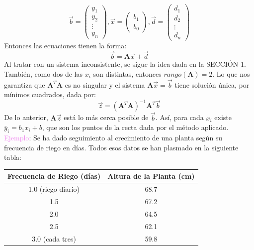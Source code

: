 \documentclass[11pt]{article}
\theoremstyle{definition}
\begin{document}
\begin{enumerate}[(i)]
\begin{equation*}
\vec{b} =
\begin{pmatrix}
y_{1}\\
y_{2}\\
\vdots\\
y_{n}
\end{pmatrix}, 
\vec{x} =
\begin{pmatrix}
b_{1}\\
b_{0}
\end{pmatrix}, 
\vec{d} =
\begin{pmatrix}
d_{1}\\
d_{2}\\
\vdots\\
d_{n}
\end{pmatrix}
\end{equation*}
Entonces las ecuaciones tienen la forma:
\begin{equation*}
\vec{b} = \textbf{A}\vec{x} + \vec{d}
\end{equation*}
Al tratar con un sistema inconsistente, se sigue la idea dada en la SECCI\'ON 1. Tambi\'en, como dos de las $x_{i}$ son distintas, entonces $rango(\textbf{A}) = 2$. Lo que nos garantiza que $\textbf{A}^{T}\textbf{A}$ es no singular y el sistema $\textbf{A}\vec{x} = \vec{b}$ tiene soluci\'on \'unica, por m\'inimos cuadrados, dada por:
\begin{equation}
\vec{z} = \left(\textbf{A}^{T}\textbf{A}\right)^{-1}\textbf{A}^{T}\vec{b}
\end{equation}
De lo anterior, $\textbf{A}\vec{z}$ est\'a lo m\'as cerca posible de $\vec{b}$. As\'i, para cada $x_{i}$ existe $\bar{y}_{i} = b_{1}x_{i} + b$, que son los puntos de la recta dada por el m\'etodo aplicado.\\
\vspace{2mm} %
\textcolor{violet}{Ejemplo}: Se ha dado seguimiento al crecimiento de una planta seg\'un su frecuencia de riego en d\'ias. Todos esos datos se han plasmado en la siguiente tabla:
\begin{table}[ht]
\centering
\begin{tabular}{|c|c|}
\hline
\textbf{Frecuencia de Riego} (d\'ias) & \textbf{Altura de la Planta} (cm) \\ \hline
1.0 (riego diario)  & 68.7\\ \hline
1.5                & 67.2\\ \hline
2.0                & 64.5\\ \hline
2.5                 & 62.1\\ \hline
3.0 (cada tres)  & 59.8\\ \hline

\end{tabular}
\end{table}
\end{enumerate}
\end{document}
